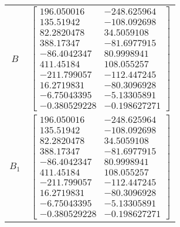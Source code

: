 \begin{tabular}{cl}
   $B$    & $\left[\begin{matrix}196.050016 & -248.625964\\135.51942 & -108.092698\\82.2820478 & 34.5059108\\388.17347 & -81.6977915\\-86.4042347 & 80.9998941\\411.45184 & 108.055257\\-211.799057 & -112.447245\\16.2719831 & -80.3096928\\-6.75043395 & -5.13305891\\-0.380529228 & -0.198627271\end{matrix}\right]$                                                                                                                                                                                                                                                                                                                                                                                                                                                                                                                                                                                                                                                                                                                                                                                                                          \\
 $B_{1}$  & $\left[\begin{matrix}196.050016 & -248.625964\\135.51942 & -108.092698\\82.2820478 & 34.5059108\\388.17347 & -81.6977915\\-86.4042347 & 80.9998941\\411.45184 & 108.055257\\-211.799057 & -112.447245\\16.2719831 & -80.3096928\\-6.75043395 & -5.13305891\\-0.380529228 & -0.198627271\end{matrix}\right]$                                                                                                                                                                                                                                                                                                                                                                                                                                                                                                                                                                                                                                                                                                                                                                                                                          \\

\end{tabular}
